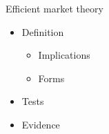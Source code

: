 
\begin{sectionframe}{Efficient market theory}
	\begin{itemize}
		\item Definition
		\begin{itemize}
			\item Implications
			\item Forms
		\end{itemize}
		\item Tests
		\item Evidence
	\end{itemize}
\end{sectionframe}

